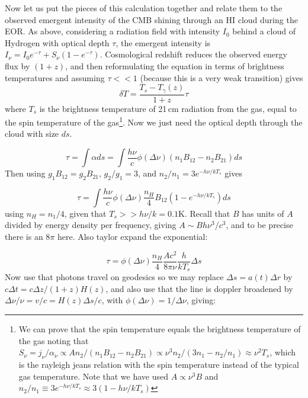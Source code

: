 Now let us put the pieces of this calculation together and relate them to the observed emergent intensity of the CMB shining through an HI cloud during the EOR. As above, considering a radiation field with intensity $I_0$ behind a cloud of Hydrogen with optical depth $\tau$, the emergent intensity is $I_\nu=I_0e^{-\tau}+S_\nu(1-e^{-\tau})$. Cosmological redshift reduces the observed energy flux by $(1+z)$, and then reformulating the equation in terms of brightness temperatures and assuming $\tau<<1$ (because this is a very weak transition) gives
\begin{equation}
\delta T=\frac{T_s-T_\gamma(z)}{1+z}\tau 
\end{equation}
where $T_s$ is the brightness temperature of 21\,cm radiation from the gas, equal to the spin temperature of the gas\footnote{We can prove that the spin temperature equals the brightness temperature of the gas noting that $S_\nu=j_\nu/\alpha_\nu\propto A n_2/(n_1B_{12}-n_2B_{21})\propto\nu^3n_2/(3n_1-n_2/n_1)\approx\nu^2 T_s$, which is the rayleigh jeans relation with the spin temperature instead of the typical gas temperature. Note that we have used  $A\propto\nu^3B$ and $n_2/n_1\equiv3e^{-h\nu/kT_s}\approx3(1-h\nu/kT_s)$}. Now we just need the optical depth through the cloud with size $ds$.

\begin{equation}
\tau=\int\alpha ds=\int\frac{h\nu}{c}\phi(\Delta\nu)(n_1B_{12}-n_2B_{21})ds
\end{equation}
Then using $g_1B_{12}=g_2B_{21}$, $g_2/g_1=3$, and $n_2/n_1=3e^{-h\nu/kT_s}$ gives

\begin{equation}
\tau=\int\frac{h\nu}{c}\phi(\Delta\nu)\frac{n_H}{4}B_{12}(1-e^{-h\nu/kT_s})ds
\end{equation}
using $n_H=n_1/4$, given that $T_s>>h\nu/k=0.1$K. Recall that $B$ has units of $A$ divided by energy density per frequency, giving $A\sim Bh\nu^3/c^3$, and to be precise there is an $8\pi$ here. Also taylor expand the exponential:

\begin{equation}
\tau=\phi(\Delta\nu)\frac{n_H}{4}\frac{Ac^2}{8\pi\nu}\frac{h}{kT_s}\Delta s
\end{equation}
Now use that photons travel on geodesics so we may replace $\Delta s=a(t)\Delta r$ by $c\Delta t=c\Delta z/(1+z)H(z)$, and also use that the line is doppler broadened by $\Delta\nu/\nu=v/c=H(z)\Delta s/c$, with $\phi(\Delta\nu)=1/\Delta \nu$, giving:

